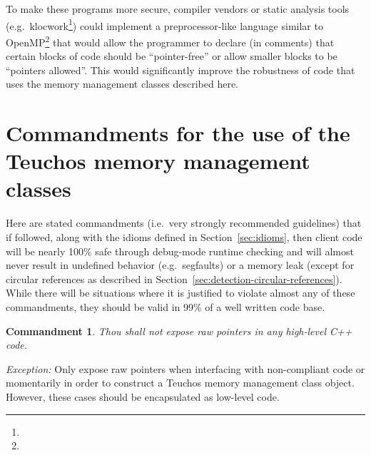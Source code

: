 \documentclass[pdf,ps2pdf,11pt]{SANDreport}
\newtheorem{commandment}{Commandment}
\begin{document}
To make these programs more secure, compiler vendors or static
analysis tools (e.g.\
klocwork\footnote{}) could implement a
preprocessor-like language similar to
OpenMP\footnote{{}} that would allow the
programmer to declare (in comments) that certain blocks of code should
be ``pointer-free'' or allow smaller blocks to be ``pointers
allowed''.  This would significantly improve the robustness of code
that uses the memory management classes described here.



%

\clearpage
\providecommand*{\phantomsection}{}
\phantomsection
{}



%
\appendix





%
{}\section{Commandments for the use of the Teuchos memory management
classes}
\label{apdx:commandments}
%

Here are stated commandments (i.e.\ very strongly recommended
guidelines) that if followed, along with the idioms defined in
Section~\ref{sec:idioms}, then client code will be nearly 100\% safe
through debug-mode runtime checking and will almost never result in
undefined behavior (e.g.\ segfaults) or a memory leak (except for
circular references as described in
Section~\ref{sec:detection-circular-references}).  While there will be
situations where it is justified to violate almost any of these
commandments, they should be valid in 99\% of a well written code
base.

\begin{commandment}
Thou shall not expose raw pointers in any high-level C++ code.
\end{commandment}

{}\textit{Exception:} Only expose raw pointers when interfacing with
non-compliant code or momentarily in order to construct a Teuchos
memory management class object.  However, these cases should be
encapsulated as low-level code.
\end{document}
